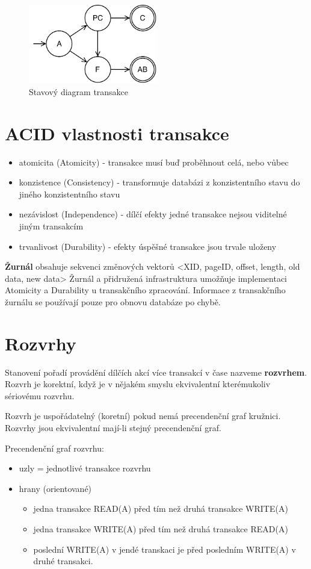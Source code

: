 \documentclass{szzclass}
\begin{document}
\begin{figure}[h!]
  \includegraphics[width=0.5\textwidth]{topics/bi-spol-10/images/state}
  \caption{Stavový diagram transakce}
\end{figure}

\section{ACID vlastnosti transakce}
\begin{itemize}
\item atomicita (Atomicity) - transakce musí buď proběhnout celá, nebo vůbec
\item konzistence (Consistency) - transformuje databázi z konzistentního stavu do jiného konzistentního stavu
\item nezávislost (Independence) - dílčí efekty jedné transakce nejsou viditelné jiným transakcím
\item trvanlivost (Durability) - efekty úspěšné transakce jsou trvale uloženy
\end{itemize}

\textbf{Žurnál} obsahuje sekvenci změnových vektorů <XID, pageID, offset, length, old data, new data>
Žurnál a přidružená infrastruktura umožňuje implementaci Atomicity a Durability u transakčního zpracování.
Informace z transakčního žurnálu se používají pouze pro obnovu databáze po chybě.

\section{Rozvrhy}
Stanovení pořadí provádění dílčích akcí více transakcí v čase nazveme \textbf{rozvrhem}. Rozvrh je korektní, když je v nějakém smyslu ekvivalentní kterémukoliv sériovému rozvrhu.

Rozvrh je uspořádatelný (koretní) pokud nemá precendenční graf kružnici.
Rozvrhy jsou ekvivalentní mají-li stejný precendenční graf.

Precendenční graf rozvrhu:
\begin{itemize}
\item uzly = jednotlivé transakce rozvrhu
\item hrany (orientované)
  \begin{itemize}
  \item jedna transakce READ(A) před tím než druhá transakce WRITE(A)
  \item jedna transakce WRITE(A) před tím než druhá transakce READ(A)
  \item poslední WRITE(A) v jendé transkaci je před posledním WRITE(A) v druhé transakci.
  \end{itemize}
\end{itemize}
\end{document}
